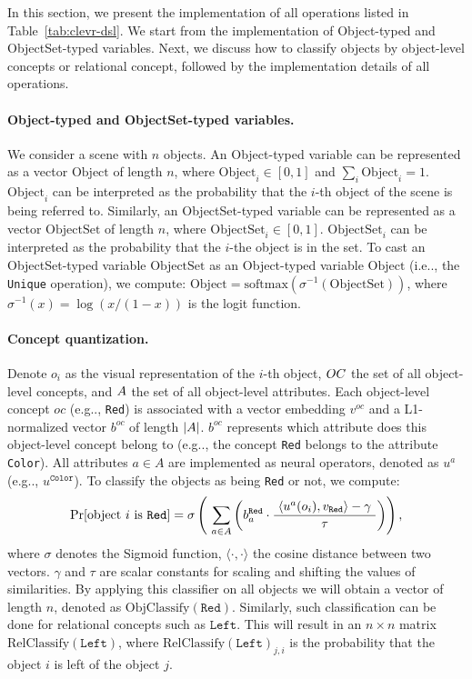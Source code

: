 \documentclass{article} \usepackage{iclr2019_conference,times}
\makeatletter
\newcommand{\sigmoid}{\sigma}
\newcommand{\tbl}[1]{Table~\ref{#1}}
\DeclareRobustCommand\onedot{\futurelet\@let@token\@onedot}
\def\@onedot{\ifx\@let@token.\else.\null\fi\xspace}
\def\eg{e.g\onedot} \def\Eg{E.g\onedot}
\def\ie{i.e\onedot} \def\Ie{I.e\onedot}
\makeatother
\begin{document}
In this section, we present the implementation of all operations listed in \tbl{tab:clevr-dsl}. We start from the implementation of Object-typed and ObjectSet-typed variables. Next, we discuss how to classify objects by object-level concepts or relational concept, followed by the implementation details of all operations.

\paragraph{Object-typed and ObjectSet-typed variables.} We consider a scene with $n$ objects. An Object-typed variable can be represented as a vector $\mathrm{Object}$ of length $n$, where $\mathrm{Object}_{i} \in [0, 1]$ and $\sum_i \mathrm{Object}_i = 1$. $\mathrm{Object}_i$ can be interpreted as the probability that the $i$-th object of the scene is being referred to. Similarly, an ObjectSet-typed variable can be represented as a vector $\mathrm{ObjectSet}$ of length $n$, where $\mathrm{ObjectSet}_{i} \in [0, 1]$. $\mathrm{ObjectSet}_i$ can be interpreted as the probability that the $i$-the object is in the set. To cast an ObjectSet-typed variable $\mathrm{ObjectSet}$ as an Object-typed variable $\mathrm{Object}$ (\ie, the \texttt{Unique} operation), we compute: $\mathrm{Object} = \mathrm{softmax}(\sigma^{-1}(\mathrm{ObjectSet}))$,
where $\sigma^{-1}(x) = \log(x / (1-x))$ is the logit function.

\paragraph{Concept quantization.} Denote $o_i$ as the visual representation of the $i$-th object, $\mathnormal{OC}$ the set of all object-level concepts, and $\mathnormal{A}$ the set of all object-level attributes. Each object-level concept $oc$ (\eg, \texttt{Red}) is associated with a vector embedding $v^{oc}$ and a L1-normalized vector $b^{oc}$ of length $|\mathnormal{A}|$. $b^{oc}$ represents which attribute does this object-level concept belong to (\eg, the concept \texttt{Red} belongs to the attribute \texttt{Color}). All attributes $a \in A$ are implemented as neural operators, denoted as $u^a$ (\eg, $u^{\texttt{Color}}$). To classify the objects as being \texttt{Red} or not, we compute:
\[\Pr[\text{object $i$ is \texttt{Red}}] = 
\sigmoid \left( ~\sum_{a \in A} \left( b^{\texttt{Red}}_a \cdot \frac{{~\langle u^a(o_i), v_{\texttt{Red}} \rangle - \gamma}~}{\tau} \right) \right), \]
where $\sigmoid$ denotes the Sigmoid function, $\langle \cdot, \cdot \rangle$ the cosine distance between two vectors. $\gamma$ and $\tau$ are scalar constants for scaling and shifting the values of similarities. By applying this classifier on all objects we will obtain a vector of length $n$, denoted as $\mathrm{ObjClassify}(\texttt{Red})$. Similarly, such classification can be done for relational concepts such as $\texttt{Left}$. This will result in an $n\times n$ matrix $\mathrm{RelClassify}(\texttt{Left})$, where $\mathrm{RelClassify}(\texttt{Left})_{j, i}$ is the probability that the object $i$ is left of the object $j$.
\end{document}

